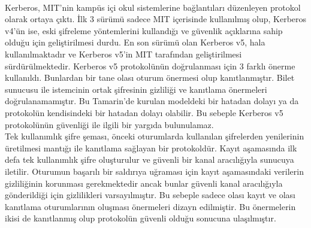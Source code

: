 \documentclass[a4paper, 12pt, titlepage]{article}
\begin{document}
\bigskip
\\ Kerberos, MIT'nin kampüs içi okul sistemlerine bağlantıları düzenleyen protokol olarak ortaya çıktı. İlk 3 sürümü sadece MIT içerisinde kullanılmış olup, Kerberos v4'ün ise, eski şifreleme yöntemlerini kullandığı ve güvenlik açıklarına sahip olduğu için geliştirilmesi durdu. En son sürümü olan Kerberos v5, hala kullanılmaktadır ve Kerberos v5'in MIT tarafından geliştirilmesi sürdürülmektedir. Kerberos v5 protokolünün doğrulanması için 3 farklı önerme kullanıldı. Bunlardan bir tane olası oturum önermesi olup kanıtlanmıştır. Bilet sunucusu ile istemcinin ortak şifresinin gizliliği ve kanıtlama önermeleri doğrulanamamıştır. Bu Tamarin'de kurulan modeldeki bir hatadan dolayı ya da protokolün kendisindeki bir hatadan dolayı olabilir. Bu sebeple Kerberos v5 protokolünün güvenliği ile ilgili bir yargıda bulunulamaz.
\bigskip
\\ Tek kullanımlık şifre şeması, önceki oturumlarda kullanılan şifrelerden yenilerinin \\üretilmesi mantığı ile kanıtlama sağlayan bir protokoldür. Kayıt aşamasında ilk defa tek kullanımlık şifre oluşturulur ve güvenli bir kanal aracılığıyla sunucuya iletilir. Oturumun başarılı bir saldırıya uğraması için kayıt aşamasındaki verilerin gizliliğinin korunması gerekmektedir ancak bunlar güvenli kanal aracılığıyla gönderildiği için gizlilikleri varsayılmıştır. Bu sebeple sadece olası kayıt ve olası kanıtlama oturumlarının oluşması önermeleri dizayn edilmiştir. Bu önermelerin ikisi de kanıtlanmış olup protokolün güvenli olduğu sonucuna ulaşılmıştır.
\newpage
\tableofcontents
\newpage

\end{document}
